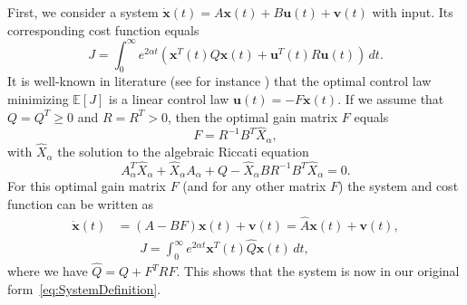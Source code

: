 \documentclass[twocolumn]{autart}
\newcommand{\ve}[1]{{\boldsymbol{#1}}} \newcommand{\tr}{\mbox{tr}} \newcommand{\ex}{\mathds{E}} \newcommand{\va}{\mathds{V}}
\begin{document}
First, we consider a system $\dot{\ve{x}}(t) = A\ve{x}(t) + B\ve{u}(t) + \ve{v}(t)$ with input. Its corresponding cost function equals
\begin{equation}
J = \int_0^\infty e^{2\alpha t} (\ve{x}^T(t) Q \ve{x}(t) + \ve{u}^T(t) R \ve{u}(t)) \, dt.
\end{equation}
It is well-known in literature (see for instance \cite{KalmanFilter}) that the optimal control law minimizing $\ex[J]$ is a linear control law $\ve{u}(t) = -F\ve{x}(t)$. If we assume that $Q = Q^T \geq 0$ and $R = R^T > 0$, then the optimal gain matrix $F$ equals
\begin{equation}
F = R^{-1} B^T \hat{X}_\alpha, \label{eq:OptimalGainMatrix}
\end{equation}
with $\hat{X}_\alpha$ the solution to the algebraic Riccati equation
\begin{equation}
A_\alpha^T \hat{X}_\alpha + \hat{X}_\alpha A_\alpha + Q - \hat{X}_\alpha B R^{-1} B^T \hat{X}_\alpha = 0.
\end{equation}
For this optimal gain matrix $F$ (and for any other matrix $F$) the system and cost function can be written as 
\begin{align}
\dot{\ve{x}}(t) & = (A - BF) \ve{x}(t) + \ve{v}(t) = \hat{A} \ve{x}(t) + \ve{v}(t), \\
& \hspace{22pt} J = \int_0^\infty e^{2\alpha t} \ve{x}^T(t) \hat{Q} \ve{x}(t) \, dt,
\end{align}
where we have $\hat{Q} = Q + F^T R F$. This shows that the system is now in our original form~\eqref{eq:SystemDefinition}.
\end{document}
